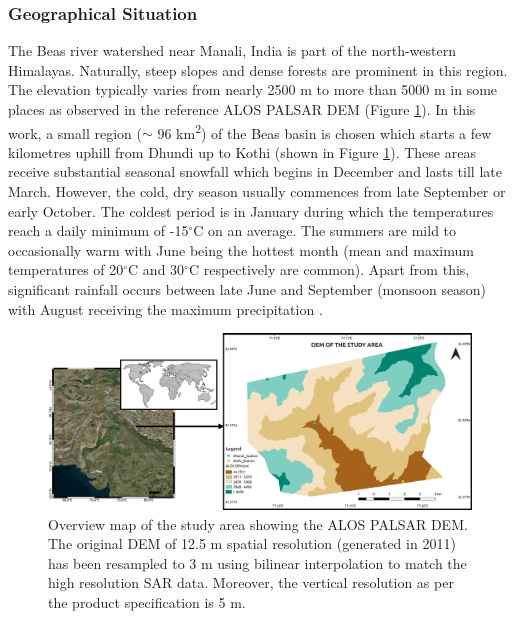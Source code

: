 \documentclass[review]{elsarticle}
\begin{document}
\subsubsection{Geographical Situation}
The Beas river watershed near Manali, India is part of the north-western Himalayas. Naturally, steep slopes and dense forests are prominent in this region. The elevation typically varies from nearly 2500 m to more than 5000 m in some places as observed in the reference ALOS PALSAR DEM (Figure \ref{fig:overview}). In this work, a small region ($\sim$ 96 km\textsuperscript{2}) of the Beas basin is chosen which starts a few kilometres uphill from Dhundi up to Kothi (shown in Figure \ref{fig:overview}). These areas receive substantial seasonal snowfall which begins in December and lasts till late March. However, the cold, dry season usually commences from late September or early October. The coldest period is in January during which the temperatures reach a daily minimum of -15$^\circ$C on an average. The summers are mild to occasionally warm with June being the hottest month (mean and maximum temperatures of 20$^\circ$C and 30$^\circ$C respectively are common). Apart from this, significant rainfall occurs between late June and September (monsoon season) with August receiving the maximum precipitation \citep{Majumdar2019, Thakur2012}.

\begin{figure}[htb]
    \centering
    \includegraphics[width=\textwidth]{Figures/Overview.png}
    \caption{Overview map of the study area showing the ALOS PALSAR DEM. The original DEM of 12.5 m spatial resolution (generated in 2011) has been resampled to 3 m using bilinear interpolation \citep{Wu2008} to match the high resolution SAR data. Moreover, the vertical resolution as per the product specification is 5 m.}
    \label{fig:overview}
\end{figure}
\end{document}
